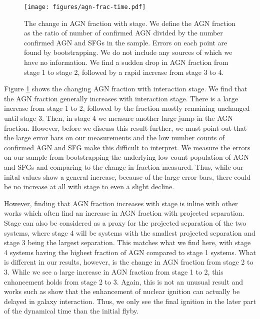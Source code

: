 \documentclass[fleqn,usenatbib]{mnras}
\begin{document}
\begin{figure}
    \centering
    \texttt{[image: figures/agn-frac-time.pdf]}
    \caption{The change in AGN fraction with stage. We define the AGN fraction as the ratio of number of confirmed AGN divided by the number confirmed AGN and SFGs in the sample. Errors on each point are found by bootstrapping. We do not include any sources of which we have no information. We find a sudden drop in AGN fraction from stage 1 to stage 2, followed by a rapid increase from stage 3 to 4.}
    \label{fig:agn-frac-time}
\end{figure}

Figure \ref{fig:agn-frac-time} shows the changing AGN fraction with interaction stage. We find that the AGN fraction generally increases with interaction stage. There is a large increase from stage 1 to 2, followed by the fraction mostly remaining unchanged until stage 3. Then, in stage 4 we measure another large jump in the AGN fraction. However, before we discuss this result further, we must point out that the large error bars on our measurements and the low number counts of confirmed AGN and SFG make this difficult to interpret. We measure the errors on our sample from bootstrapping the underlying low-count population of AGN and SFGs and comparing to the change in fraction measured. Thus, while our inital values show a general increase, because of the large error bars, there could be no increase at all with stage to even a slight decline.

However, finding that AGN fraction increases with stage is inline with other works \citep{2011MNRAS.418.2043E, 2023ApJ...942..107S} which often find an increase in AGN fraction with projected separation. Stage can also be considered as a proxy for the projected separation of the two systems, where stage 4 will be systems with the smallest projected separation and stage 3 being the largest separation. This matches what we find here, with stage 4 systems having the highest fraction of AGN compared to stage 1 systems. What is different in our results, however, is the change in AGN fraction from stage 2 to 3. While we see a large increase in AGN fraction from stage 1 to 2, this enhancement holds from stage 2 to 3. Again, this is not an unusual result and works such as \citet{2011MNRAS.418.2043E} show that the enhancement of nuclear ignition can actually be delayed in galaxy interaction. Thus, we only see the final ignition in the later part of the dynamical time than the initial flyby. 
\end{document}
